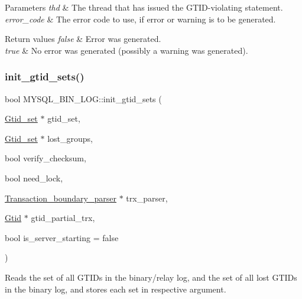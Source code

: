 \begin{DoxyParams}{Parameters}
{\em thd} & The thread that has issued the G\+T\+ID-\/violating statement.\\
\hline
{\em error\+\_\+code} & The error code to use, if error or warning is to be generated.\\
\hline
\end{DoxyParams}

\begin{DoxyRetVals}{Return values}
{\em false} & Error was generated. \\
\hline
{\em true} & No error was generated (possibly a warning was generated). \\
\hline
\end{DoxyRetVals}
\mbox{\label{group__Binary__Log_gab52138e0e18c6bca2812e4051164db4f}} 
\subsubsection{\texorpdfstring{init\+\_\+gtid\+\_\+sets()}{init\_gtid\_sets()}}
{\footnotesize\ttfamily bool M\+Y\+S\+Q\+L\+\_\+\+B\+I\+N\+\_\+\+L\+O\+G\+::init\+\_\+gtid\+\_\+sets (\begin{DoxyParamCaption}\item[{\mbox{\hyperlink{classGtid__set}{Gtid\+\_\+set}} $\ast$}]{gtid\+\_\+set,  }\item[{\mbox{\hyperlink{classGtid__set}{Gtid\+\_\+set}} $\ast$}]{lost\+\_\+groups,  }\item[{bool}]{verify\+\_\+checksum,  }\item[{bool}]{need\+\_\+lock,  }\item[{\mbox{\hyperlink{classTransaction__boundary__parser}{Transaction\+\_\+boundary\+\_\+parser}} $\ast$}]{trx\+\_\+parser,  }\item[{\mbox{\hyperlink{structGtid}{Gtid}} $\ast$}]{gtid\+\_\+partial\+\_\+trx,  }\item[{bool}]{is\+\_\+server\+\_\+starting = {\ttfamily false} }\end{DoxyParamCaption})}

Reads the set of all G\+T\+I\+Ds in the binary/relay log, and the set of all lost G\+T\+I\+Ds in the binary log, and stores each set in respective argument.


